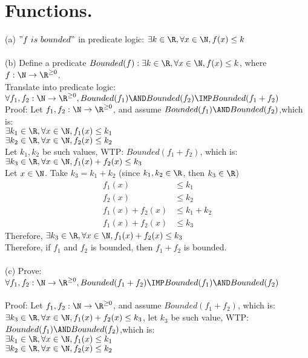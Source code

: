 \documentclass[12pt]{article}
\begin{document}
\section{Functions.}
(a) $"f\ is\ bounded"$ in predicate logic: $\exists k \in \R,\forall x \in \N,f(x) \le k$\\
\\
(b) Define a predicate $Bounded(f): \exists k \in \R,\forall x\in \N,f(x) \le k$, where $f: \N \to \R ^{\ge 0}$.\\
Translate into predicate logic: $\forall f_1,f_2:\N \to \R^{\ge 0},Bounded(f_1) \AND Bounded(f_2) \IMP Bounded(f_1+f_2)$\\
Proof: Let $f_1,f_2:\N \to \R^{\ge 0}$, and assume $Bounded(f_1) \AND Bounded(f_2)$,which is: \\
$\exists k_1 \in \R,\forall x \in \N,f_1(x) \le k_1$\\
$\exists k_2 \in \R,\forall x \in \N,f_2(x) \le k_2$\\
Let $k_1,k_2$ be such values, WTP: $Bounded(f_1+f_2)$, which is: $\exists k_3 \in \R,\forall x \in \N,f_1(x)+f_2(x) \le k_3$\\
Let $x \in \N$. Take $k_3 = k_1 + k_2$ (since $k_1,k_2 \in \R$, then $k_3 \in \R$)\\
\begin{align*}
    \tag{by our assumption}
    f_1(x) &\le k_1\\
    \tag{by our assumption}
    f_2(x) &\le k_2\\
    f_1(x) + f_2(x) &\le k_1 + k_2\\
    f_1(x) + f_2(x) &\le k_3
\end{align*}
Therefore, $\exists k_3 \in \R,\forall x \in \N,f_1(x)+f_2(x) \le k_3$\\
Therefore, if $f_1$ and $f_2$ is bounded, then $f_1 + f_2$ is bounded.\\
\\
\noindent (c) Prove: $\forall f_1,f_2:\N \to \R^{\ge 0}, Bounded(f_1 + f_2) \IMP Bounded(f_1) \AND Bounded(f_2)$\\
\\
Proof: Let $f_1, f_2:\N \to \R^{\ge 0}$, and assume $Bounded(f_1 + f_2)$, which is: $\exists k_3 \in \R,\forall x \in \N,f_1(x) + f_2(x) \le k_3$, let $k_3$ be such value, WTP:$Bounded(f_1) \AND Bounded(f_2)$,which is:\\
$\exists k_1 \in \R,\forall x \in \N,f_1(x) \le k_1$\\
$\exists k_2 \in \R,\forall x \in \N,f_2(x) \le k_2$\\
\end{document}
